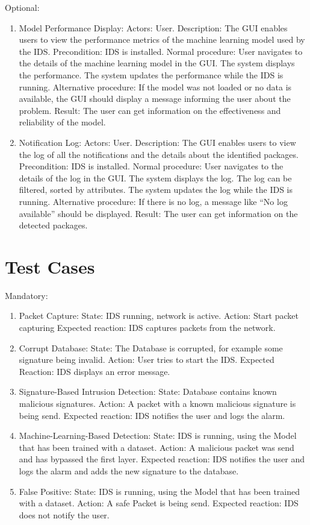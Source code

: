 \documentclass[oneside, english]{reports/assets/sdqtechreport}
\begin{document}
Optional:

\begin{enumerate}
	\item Model Performance Display: Actors: User. Description: The GUI enables users to
	      view the performance metrics of the machine learning model used by the IDS.
	      Precondition: IDS is installed. Normal procedure: User navigates to the details
	      of the machine learning model in the GUI. The system displays the performance.
	      The system updates the performance while the IDS is running. Alternative
	      procedure: If the model was not loaded or no data is available, the GUI should
	      display a message informing the user about the problem. Result: The user can
	      get information on the effectiveness and reliability of the model.
	\item Notification Log: Actors: User. Description: The GUI enables users to view the
	      log of all the notifications and the details about the identified packages.
	      Precondition: IDS is installed. Normal procedure: User navigates to the details
	      of the log in the GUI. The system displays the log. The log can be filtered,
	      sorted by attributes. The system updates the log while the IDS is running.
	      Alternative procedure: If there is no log, a message like “No log available”
	      should be displayed. Result: The user can get information on the detected
	      packages.
\end{enumerate}

\chapter{Test Cases}
\label{chap:TestCases}

Mandatory:

\begin{enumerate}
	\item Packet Capture: 
 	      State: IDS running, network is active. 
	      Action: Start packet capturing 
              Expected reaction: IDS captures packets from the network.
	\item Corrupt Database: State: The Database is corrupted, for example some signature
	      being invalid. Action: User tries to start the IDS. Expected Reaction: IDS
	      displays an error message.
	\item Signature-Based Intrusion Detection: State: Database contains known malicious
	      signatures. Action: A packet with a known malicious signature is being send.
	      Expected reaction: IDS notifies the user and logs the alarm.
	\item Machine-Learning-Based Detection: State: IDS is running, using the Model that
	      has been trained with a dataset. Action: A malicious packet was send and has
	      bypassed the first layer. Expected reaction: IDS notifies the user and logs the
	      alarm and adds the new signature to the database.
	\item False Positive: State: IDS is running, using the Model that has been trained
	      with a dataset. Action: A safe Packet is being send. Expected reaction: IDS
	      does not notify the user.
\end{enumerate}
\end{document}
